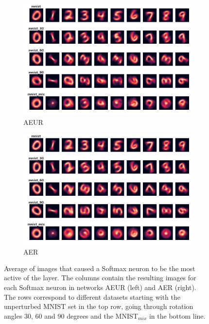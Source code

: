 \documentclass[10pt,a4paper]{article}
\begin{document}
\begin{figure}[h]
\centering
\begin{subfigure}{.49\textwidth}
  \centering
  \includegraphics[width=1\linewidth]{STA_Softmax_AEUR_new.png}
  \caption{\footnotesize{AEUR}}
  \label{fig:STA_AEUR}
\end{subfigure}%
\begin{subfigure}{.49\textwidth}
  \centering
  \includegraphics[width=1\linewidth]{STA_Softmax_AER_new.png}
  \caption{\footnotesize{AER} }
  \label{fig:STA_AER}
\end{subfigure}
\caption{\footnotesize{Average of images that caused a Softmax neuron to be the most active of the layer. The columns contain the resulting images for each Softmax neuron in networks AEUR (left) and AER (right). The rows correspond to different datasets starting with the unperturbed MNIST set in the top row, going through rotation angles 30, 60 and 90 degrees and the MNIST$_{mix}$ in the bottom line.}}
\label{fig:STA_Softmax}
\end{figure}
\end{document}
